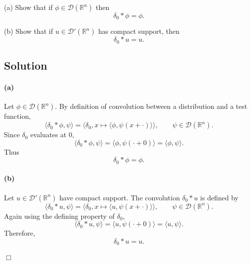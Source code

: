 \documentclass[12pt,a4paper]{article}
\theoremstyle{plain}
\theoremstyle{definition}
\theoremstyle{remark}
\theoremstyle{remark}
\begin{document}
\noindent
(a)\; Show that if $\phi \in \mathcal{D}(\mathbb{R}^n)$ then
\[
\delta_0 * \phi = \phi .
\]

\medskip
\noindent
(b)\; Show that if $u \in \mathcal{D}'(\mathbb{R}^n)$ has compact support, then
\[
\delta_0 * u = u .
\]

\subsection*{Solution}

\paragraph{(a)}  
Let $\phi \in \mathcal{D}(\mathbb{R}^n)$.  
By definition of convolution between a distribution and a test function,
\[
\langle \delta_0 * \phi , \psi \rangle
= \langle \delta_0 , x \mapsto \langle \phi , \psi(x+\cdot)\rangle \rangle,
\qquad \psi \in \mathcal{D}(\mathbb{R}^n).
\]
Since $\delta_0$ evaluates at $0$,
\[
\langle \delta_0 * \phi , \psi \rangle
= \langle \phi , \psi(\cdot + 0)\rangle
= \langle \phi , \psi \rangle .
\]
Thus
\[
\delta_0 * \phi = \phi .
\]

\paragraph{(b)}  
Let $u \in \mathcal{D}'(\mathbb{R}^n)$ have compact support.  
The convolution $\delta_0 * u$ is defined by
\[
\langle \delta_0 * u , \psi \rangle
= \langle \delta_0 , x \mapsto \langle u , \psi(x+\cdot)\rangle \rangle,
\qquad \psi \in \mathcal{D}(\mathbb{R}^n).
\]
Again using the defining property of $\delta_0$,
\[
\langle \delta_0 * u , \psi \rangle
= \langle u , \psi(\cdot + 0)\rangle
= \langle u , \psi \rangle.
\]
Therefore,
\[
\delta_0 * u = u .
\]

\hfill$\Box$
\end{document}
